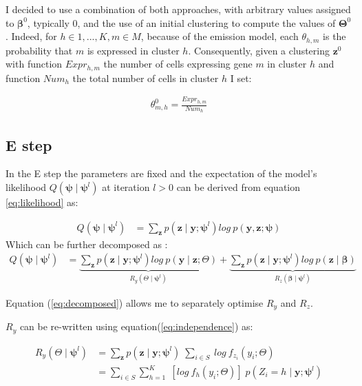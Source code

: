 I decided to use a combination of both approaches, with arbitrary values assigned to $\boldsymbol{\beta}^{0}$, typically $0$, and the use of an initial clustering to compute the values of $\boldsymbol{\Theta}^{0}$. Indeed, for $h \in {1,...,K}, m \in M$, because of the emission model, each $\theta_{h,m}$ is the probability that $m$ is expressed in cluster $h$. Consequently, given a clustering $\boldsymbol{z}^{0}$ with function $Expr_{h,m}$ the number of cells expressing gene $m$ in cluster $h$ and function $Num_h$ the total number of cells in cluster $h$ I set:

\begin{align*}
\theta_{m,h}^{0} = \frac{Expr_{h,m}}{Num_h}
\end{align*}

	\subsection{E step}

In the E step the parameters are fixed and the expectation of the model's likelihood $Q(\boldsymbol{\psi} \mid \boldsymbol{\psi}^{l})$ at iteration $l > 0$ can be derived from equation \ref{eq:likelihood} as:

\begin{align}
Q(\boldsymbol{\psi} \mid \boldsymbol{\psi}^{l}) &= \sum\limits_{\boldsymbol{z}} p(\boldsymbol{z} \mid \boldsymbol{y} ; \boldsymbol{\psi}^{l}) log\:p(\boldsymbol{y},\boldsymbol{z};\boldsymbol{\psi}) \nonumber
\end{align}
Which can be further decomposed as :
\begin{align}
\label{eq:decomposed}
Q(\boldsymbol{\psi} \mid \boldsymbol{\psi}^{l}) &= \underbrace{\sum\limits_{\boldsymbol{z}} p(\boldsymbol{z} \mid \boldsymbol{y} ; \boldsymbol{\psi}^{l}) log\:p(\boldsymbol{y} \mid \boldsymbol{z} ; \Theta)}_{R_y(\Theta\mid \boldsymbol{\psi}^l)} 
 + \underbrace{\sum\limits_{\boldsymbol{z}} p(\boldsymbol{z} \mid \boldsymbol{y} ; \boldsymbol{\psi}^{l}) log\:p(\boldsymbol{z} \mid \boldsymbol{\beta})}_{R_z(\boldsymbol{\beta}\mid \boldsymbol{\psi}^l)}
\end{align}

Equation (\ref{eq:decomposed}) allows me to separately optimise $R_y$ and $R_z$.


$R_y$ can be re-written using equation(\ref{eq:independence}) as:

\begin{align*}
R_y(\Theta\mid \boldsymbol{\psi}^l) &= \sum\limits_{\boldsymbol{z}} p(\boldsymbol{z}\mid \boldsymbol{y} ; \boldsymbol{\psi}^{l})\;\sum\limits_{i \in S}\: log\: f_{z_i} (y_i ; \Theta)\\
&= \sum\limits_{i \in S} \sum\limits_{h=1}^{K}\; \left[log\: f_{h} (y_i  ; \Theta) \right] \; p(Z_i = h \mid \boldsymbol{y};\boldsymbol{\psi}^{l})
\end{align*}  

